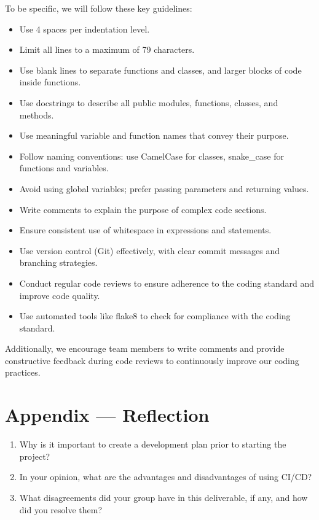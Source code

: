 \documentclass{article}
\begin{document}
To be specific, we will follow these key guidelines:
\begin{itemize}
  \item Use 4 spaces per indentation level.
  \item Limit all lines to a maximum of 79 characters.
  \item Use blank lines to separate functions and classes, and larger blocks of code inside functions.
  \item Use docstrings to describe all public modules, functions, classes, and methods.
  \item Use meaningful variable and function names that convey their purpose.
  \item Follow naming conventions: use CamelCase for classes, snake\_case for functions and variables.
  \item Avoid using global variables; prefer passing parameters and returning values.
  \item Write comments to explain the purpose of complex code sections.
  \item Ensure consistent use of whitespace in expressions and statements.
  \item Use version control (Git) effectively, with clear commit messages and branching strategies.
  \item Conduct regular code reviews to ensure adherence to the coding standard and improve code quality.
  \item Use automated tools like flake8 to check for compliance with the coding standard.
\end{itemize}

Additionally, we encourage team members to write comments and provide constructive feedback during code reviews
to continuously improve our coding practices.

\newpage{}

\section*{Appendix --- Reflection}


 

\begin{enumerate}
    \item Why is it important to create a development plan prior to starting the
    project?
    \item In your opinion, what are the advantages and disadvantages of using
    CI/CD?
    \item What disagreements did your group have in this deliverable, if any,
    and how did you resolve them?
\end{enumerate}
\end{document}
